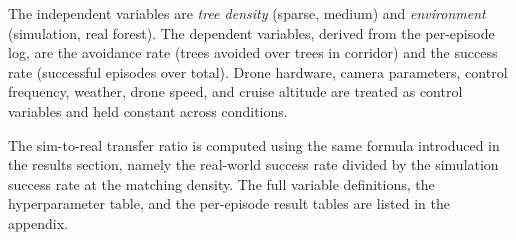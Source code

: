 \documentclass[../main.tex]{subfiles}
\begin{document}
The independent variables are \textit{tree density} (sparse, medium) and \textit{environment} (simulation, real forest). The dependent variables, derived from the per-episode log, are the avoidance rate (trees avoided over trees in corridor) and the success rate (successful episodes over total). Drone hardware, camera parameters, control frequency, weather, drone speed, and cruise altitude are treated as control variables and held constant across conditions.

The sim-to-real transfer ratio is computed using the same formula introduced in the results section, namely the real-world success rate divided by the simulation success rate at the matching density. The full variable definitions, the hyperparameter table, and the per-episode result tables are listed in the appendix.


\end{document}
